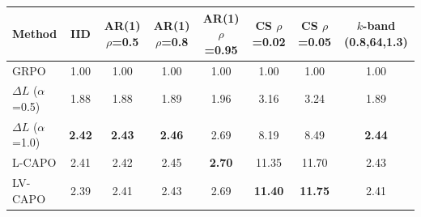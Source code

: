 \begin{tabular}{lccccccc}
\toprule
Method & IID & AR(1) $\rho$=0.5 & AR(1) $\rho$=0.8 & AR(1) $\rho$=0.95 & CS $\rho$=0.02 & CS $\rho$=0.05 & $k$-band (0.8,64,1.3) \\
\midrule
GRPO & 1.00 & 1.00 & 1.00 & 1.00 & 1.00 & 1.00 & 1.00 \\
$\Delta L$ ($\alpha$=0.5) & 1.88 & 1.88 & 1.89 & 1.96 & 3.16 & 3.24 & 1.89 \\
$\Delta L$ ($\alpha$=1.0) & \textbf{2.42} & \textbf{2.43} & \textbf{2.46} & 2.69 & 8.19 & 8.49 & \textbf{2.44} \\
L-CAPO & 2.41 & 2.42 & 2.45 & \textbf{2.70} & 11.35 & 11.70 & 2.43 \\
LV-CAPO & 2.39 & 2.41 & 2.43 & 2.69 & \textbf{11.40} & \textbf{11.75} & 2.41 \\
\bottomrule
\end{tabular}
